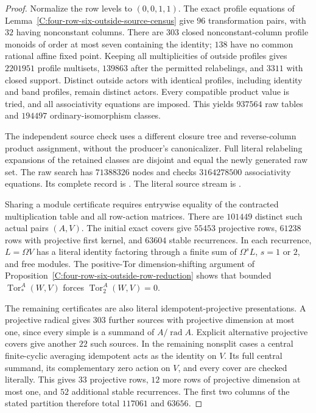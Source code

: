 \begin{proof}
Normalize the row levels to $(0,0,1,1)$.  The exact profile
equations of Lemma~\ref{C:four-row-six-outside-source-census}
give $96$ transformation pairs, with $32$ having nonconstant
columns.  There are $303$ closed nonconstant-column profile monoids
of order at most seven containing the identity; $138$ have no
common rational affine fixed point.  Keeping all multiplicities
of outside profiles gives $2201951$ profile multisets, $139863$
after the permitted relabelings, and $3311$ with closed support.
Distinct outside actors with identical profiles, including
identity and band profiles, remain distinct actors.
Every compatible product value is tried, and all associativity
equations are imposed.  This yields $937564$ raw tables and
$194497$ ordinary-isomorphism classes.

The independent source check uses a different closure tree and
reverse-column product assignment, without the producer's
canonicalizer.  Full literal relabeling expansions of the retained
classes are disjoint and equal the newly generated raw set.
The raw search has $71388326$ nodes and checks
$3164278500$ associativity equations.  Its complete record is
.
The literal source stream is
.

Sharing a module certificate requires entrywise equality of the
contracted multiplication table and all row-action matrices.
There are $101449$ distinct such actual pairs $(A,V)$.
The initial exact covers give $55453$ projective rows, $61238$
rows with projective first kernel, and $63604$ stable recurrences.
In each recurrence, $L=\Omega V$ has a literal identity factoring
through a finite sum of $\Omega^sL$, $s=1$ or $2$, and free modules.
The positive-Tor dimension-shifting argument of
Proposition~\ref{C:four-row-six-outside-row-reduction} shows that
bounded $\operatorname{Tor}_*^A(W,V)$ forces
$\operatorname{Tor}_2^A(W,V)=0$.

The remaining certificates are also literal idempotent-projective
presentations.  A projective radical gives $303$ further sources
with projective dimension at most one, since every simple is a
summand of $A/\operatorname{rad}A$.  Explicit alternative projective
covers give another $22$ such sources.  In the remaining nonsplit
cases a central finite-cyclic averaging idempotent acts as the
identity on $V$.  Its full central summand, its complementary
zero action on $V$, and every cover are checked literally.
This gives $33$ projective rows, $12$ more rows of projective
dimension at most one, and $52$ additional stable recurrences.
The first two columns of the stated partition therefore total
$117061$ and $63656$.


\end{proof}
